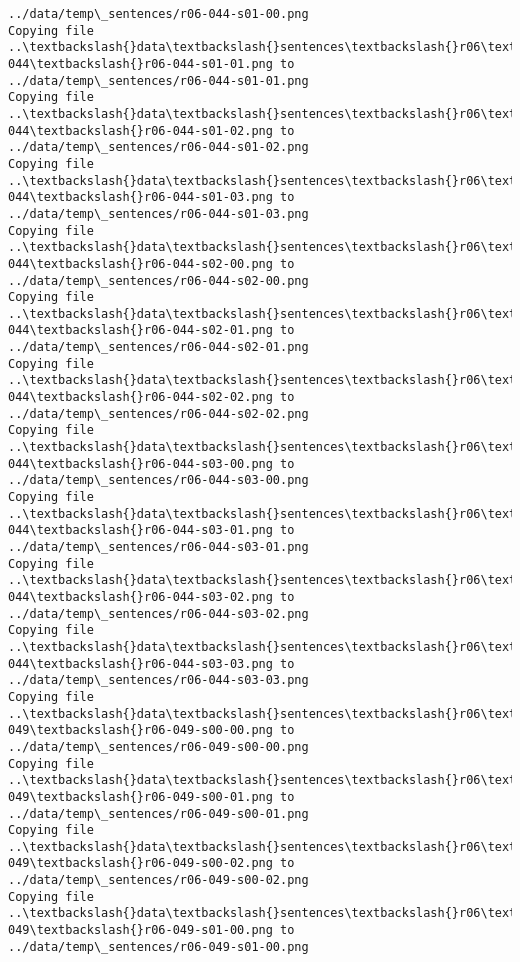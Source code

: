 \documentclass[11pt]{article}
\begin{document}
\begin{Verbatim}[commandchars=\\\{\}]
../data/temp\_sentences/r06-044-s01-00.png
Copying file ..\textbackslash{}data\textbackslash{}sentences\textbackslash{}r06\textbackslash{}r06-044\textbackslash{}r06-044-s01-01.png to
../data/temp\_sentences/r06-044-s01-01.png
Copying file ..\textbackslash{}data\textbackslash{}sentences\textbackslash{}r06\textbackslash{}r06-044\textbackslash{}r06-044-s01-02.png to
../data/temp\_sentences/r06-044-s01-02.png
Copying file ..\textbackslash{}data\textbackslash{}sentences\textbackslash{}r06\textbackslash{}r06-044\textbackslash{}r06-044-s01-03.png to
../data/temp\_sentences/r06-044-s01-03.png
Copying file ..\textbackslash{}data\textbackslash{}sentences\textbackslash{}r06\textbackslash{}r06-044\textbackslash{}r06-044-s02-00.png to
../data/temp\_sentences/r06-044-s02-00.png
Copying file ..\textbackslash{}data\textbackslash{}sentences\textbackslash{}r06\textbackslash{}r06-044\textbackslash{}r06-044-s02-01.png to
../data/temp\_sentences/r06-044-s02-01.png
Copying file ..\textbackslash{}data\textbackslash{}sentences\textbackslash{}r06\textbackslash{}r06-044\textbackslash{}r06-044-s02-02.png to
../data/temp\_sentences/r06-044-s02-02.png
Copying file ..\textbackslash{}data\textbackslash{}sentences\textbackslash{}r06\textbackslash{}r06-044\textbackslash{}r06-044-s03-00.png to
../data/temp\_sentences/r06-044-s03-00.png
Copying file ..\textbackslash{}data\textbackslash{}sentences\textbackslash{}r06\textbackslash{}r06-044\textbackslash{}r06-044-s03-01.png to
../data/temp\_sentences/r06-044-s03-01.png
Copying file ..\textbackslash{}data\textbackslash{}sentences\textbackslash{}r06\textbackslash{}r06-044\textbackslash{}r06-044-s03-02.png to
../data/temp\_sentences/r06-044-s03-02.png
Copying file ..\textbackslash{}data\textbackslash{}sentences\textbackslash{}r06\textbackslash{}r06-044\textbackslash{}r06-044-s03-03.png to
../data/temp\_sentences/r06-044-s03-03.png
Copying file ..\textbackslash{}data\textbackslash{}sentences\textbackslash{}r06\textbackslash{}r06-049\textbackslash{}r06-049-s00-00.png to
../data/temp\_sentences/r06-049-s00-00.png
Copying file ..\textbackslash{}data\textbackslash{}sentences\textbackslash{}r06\textbackslash{}r06-049\textbackslash{}r06-049-s00-01.png to
../data/temp\_sentences/r06-049-s00-01.png
Copying file ..\textbackslash{}data\textbackslash{}sentences\textbackslash{}r06\textbackslash{}r06-049\textbackslash{}r06-049-s00-02.png to
../data/temp\_sentences/r06-049-s00-02.png
Copying file ..\textbackslash{}data\textbackslash{}sentences\textbackslash{}r06\textbackslash{}r06-049\textbackslash{}r06-049-s01-00.png to
../data/temp\_sentences/r06-049-s01-00.png

\end{Verbatim}
\end{document}
